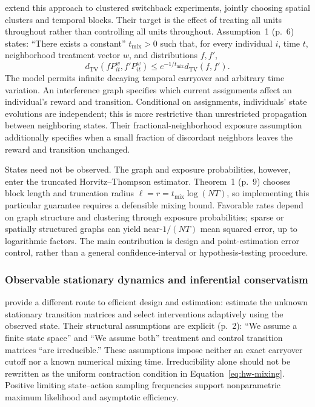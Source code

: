 \citet{jia2025} extend this approach to clustered switchback experiments, jointly choosing spatial clusters and temporal blocks. Their target is the effect of treating all units throughout rather than controlling all units throughout. Assumption~1 (p.~6) states: ``There exists a constant'' $t_{\mathrm{mix}}>0$ such that, for every individual $i$, time $t$, neighborhood treatment vector $w$, and distributions $f,f'$,
\begin{equation}
 d_{\mathrm{TV}}(fP_{it}^{w},f'P_{it}^{w})
 \leq e^{-1/t_{\mathrm{mix}}}d_{\mathrm{TV}}(f,f').
\end{equation}
The model permits infinite decaying temporal carryover and arbitrary time variation. An interference graph specifies which current assignments affect an individual's reward and transition. Conditional on assignments, individuals' state evolutions are independent; this is more restrictive than unrestricted propagation between neighboring states. Their fractional-neighborhood exposure assumption additionally specifies when a small fraction of discordant neighbors leaves the reward and transition unchanged.

States need not be observed. The graph and exposure probabilities, however, enter the truncated Horvitz--Thompson estimator. Theorem~1 (p.~9) chooses block length and truncation radius $\ell=r=t_{\mathrm{mix}}\log(NT)$, so implementing this particular guarantee requires a defensible mixing bound. Favorable rates depend on graph structure and clustering through exposure probabilities; sparse or spatially structured graphs can yield near-$1/(NT)$ mean squared error, up to logarithmic factors. The main contribution is design and point-estimation error control, rather than a general confidence-interval or hypothesis-testing procedure.

\subsubsection{Observable stationary dynamics and inferential conservatism}

\citet{glynn2020} provide a different route to efficient design and estimation: estimate the unknown stationary transition matrices and select interventions adaptively using the observed state. Their structural assumptions are explicit (p.~2): ``We assume a finite state space'' and ``We assume both'' treatment and control transition matrices ``are irreducible.'' These assumptions impose neither an exact carryover cutoff nor a known numerical mixing time. Irreducibility alone should not be rewritten as the uniform contraction condition in Equation~\eqref{eq:hw-mixing}. Positive limiting state--action sampling frequencies support nonparametric maximum likelihood and asymptotic efficiency.


